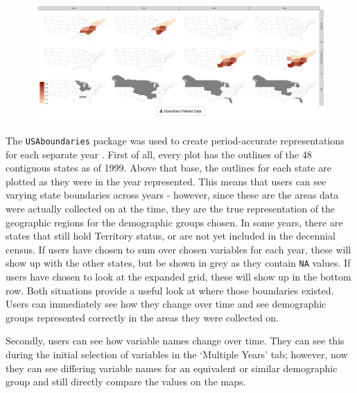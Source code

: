 \documentclass[DIV=calc, paper=a4, fontsize=10pt, twocolumn]{scrartcl}\usepackage[]{graphicx}\usepackage[]{color}
\begin{document}
\begin{figure}[hbtp]
\centering
\includegraphics[width=\textwidth]{./figures/visualize_slaves_40years.png}  
\label{shiny_3}
\end{figure}

\par The \texttt{USAboundaries} package was used to create period-accurate representations for each separate year \citep{USAboundaries}. First of all, every plot has the outlines of the 48 contiguous states as of 1999. Above that base, the outlines for each state are plotted as they were in the year represented. This means that users can see varying state boundaries across years - however, since these are the areas data were actually collected on at the time, they are the true representation of the geographic regions for the demographic groups chosen. In some years, there are states that still hold Territory status, or are not yet included in the decennial census. If users have chosen to sum over chosen variables for each year, these will show up with the other states, but be shown in grey as they contain \texttt{NA} values. If users have chosen to look at the expanded grid, these will show up in the bottom row. Both situations provide a useful look at where those boundaries existed. Users can immediately see how they change over time and see demographic groups represented correctly in the areas they were collected on.  

\par Secondly, users can see how variable names change over time. They can see this during the initial selection of variables in the `Multiple Years' tab; however, now they can see differing variable names for an equivalent or similar demographic group and still directly compare the values on the maps. 
\end{document}
